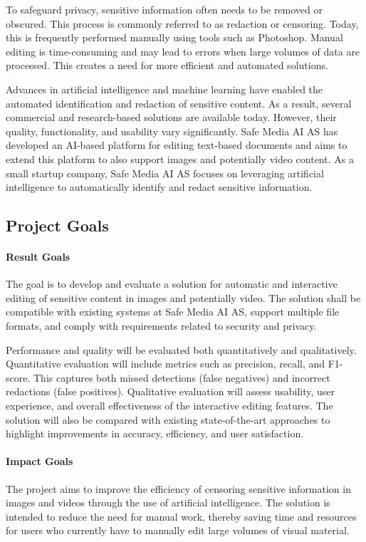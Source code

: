 To safeguard privacy, sensitive information often needs to be removed or obscured. This process is commonly referred to as redaction or censoring. Today, this is frequently performed manually using tools such as Photoshop. Manual editing is time-consuming and may lead to errors when large volumes of data are processed. This creates a need for more efficient and automated solutions.

Advances in artificial intelligence and machine learning have enabled the automated identification and redaction of sensitive content. As a result, several commercial and research-based solutions are available today. However, their quality, functionality, and usability vary significantly. Safe Media AI AS has developed an AI-based platform for editing text-based documents and aims to extend this platform to also support images and potentially video content. As a small startup company, Safe Media AI AS focuses on leveraging artificial intelligence to automatically identify and redact sensitive information.

\subsection{Project Goals}
\label{appsec:goals}

\paragraph{Result Goals}
The goal is to develop and evaluate a solution for automatic and interactive editing of sensitive content in images and potentially video. The solution shall be compatible with existing systems at Safe Media AI AS, support multiple file formats, and comply with requirements related to security and privacy.

Performance and quality will be evaluated both quantitatively and qualitatively. Quantitative evaluation will include metrics such as precision, recall, and F1-score. This captures both missed detections (false negatives) and incorrect redactions (false positives). Qualitative evaluation will assess usability, user experience, and overall effectiveness of the interactive editing features. The solution will also be compared with existing state-of-the-art approaches to highlight improvements in accuracy, efficiency, and user satisfaction.

\paragraph{Impact Goals}
The project aims to improve the efficiency of censoring sensitive information in images and videos through the use of artificial intelligence. The solution is intended to reduce the need for manual work, thereby saving time and resources for users who currently have to manually edit large volumes of visual material.

